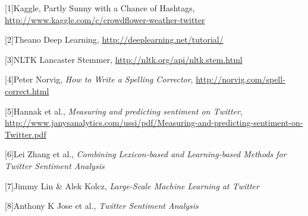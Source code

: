 \documentclass{article}
\begin{document}
\small{
	[1]Kaggle, Partly Sunny with a Chance of Hashtags, \url{http://www.kaggle.com/c/crowdflower-weather-twitter}
	
	[2]Theano Deep Learning, \url{http://deeplearning.net/tutorial/}
	
	[3]NLTK Lancaster Stemmer, \url{http://nltk.org/api/nltk.stem.html}
	
	[4]Peter Norvig, {\it How to Write a Spelling Corrector}, \url{http://norvig.com/spell-correct.html}

	[5]Hannak et al., {\it Measuring and predicting sentiment on Twitter}, \url{http://www.janysanalytics.com/ussi/pdf/Measuring-and-predicting-sentiment-on-Twitter.pdf}

	[6]Lei Zhang et al., {\it Combining Lexicon-based and Learning-based Methods for Twitter Sentiment Analysis}

	[7]Jimmy Lin \& Alek Kolcz, {\it Large-Scale Machine Learning at Twitter}

	[8]Anthony K Jose et al., {\it Twitter Sentiment Analysis}
}
\end{document}
